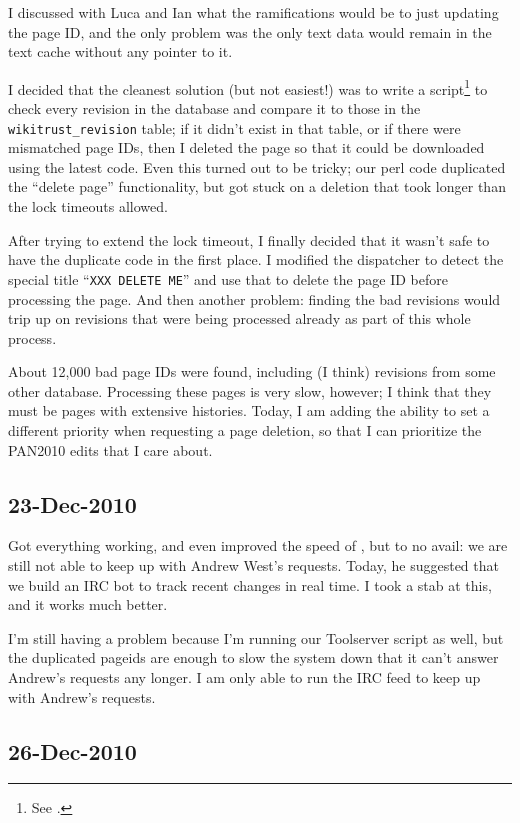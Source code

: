 I discussed with Luca and Ian what the ramifications would be
to just updating the page ID, and the only problem was the only
text data would remain in the text cache without any pointer to it.

I decided that the cleanest solution (but not easiest!) was to
write a script\footnote{See .}
to check every revision in the database and compare
it to those in the \texttt{wikitrust\_revision} table; if it didn't
exist in that table, or if there were mismatched page IDs, then I
deleted the page so that it could be downloaded using the latest code.
Even this turned out to be tricky; our perl code duplicated the
``delete page'' functionality, but got stuck on a deletion that
took longer than the lock timeouts allowed.

After trying to extend the lock timeout, I finally decided that
it wasn't safe to have the duplicate code in the first place.
I modified the dispatcher to detect the special title
``\texttt{XXX DELETE ME}'' and use that to delete the page ID
before processing the page.
And then another problem: finding the bad revisions would trip up
on revisions that were being processed already as part of this
whole process.

About 12,000 bad page IDs were found, including (I think) revisions
from some other database.
Processing these pages is very slow, however; I think that they must
be pages with extensive histories.
Today, I am adding the ability to set a different priority when requesting
a page deletion, so that I can prioritize the PAN2010 edits
that I care about.

\subsection{23-Dec-2010}

Got everything working, and even improved the speed of {\mysql},
but to no avail: we are still not able to keep up with Andrew West's
requests.
Today, he suggested that we build an IRC bot to track recent
changes in real time.
I took a stab at this, and it works much better.

I'm still having a problem because I'm running our Toolserver
script as well, but the duplicated pageids are enough to slow the
system down that it can't answer Andrew's requests any longer.
I am only able to run the IRC feed to keep up with Andrew's requests.

\subsection{26-Dec-2010}

